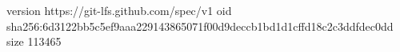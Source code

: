 version https://git-lfs.github.com/spec/v1
oid sha256:6d3122bb5c5ef9aaa229143865071f00d9deccb1bd1d1cffd18c2c3ddfdec0dd
size 113465
